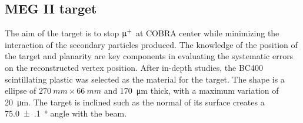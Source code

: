 \begin{refsection}
    \subsection{MEG II target}
        The aim of the target is to stop $\upmu^+$ at COBRA center while minimizing the interaction of the secondary particles produced.
        The knowledge of the position of the target and planarity are key components in evaluating the systematic errors on the reconstructed vertex position. 
        After in-depth studies, the BC400 scintillating plastic was selected as the material for the target.
        The shape is a ellipse of $\SI{270}{mm}\times\SI{66}{mm}$ and \SI{170}{\micro m} thick, with a maximum variation of \SI{20}{\micro m}. 
        The target is inclined such as the normal of its surface creates a \SI{75.0(1)}{\degree} angle with the beam. 
        

\end{refsection}
